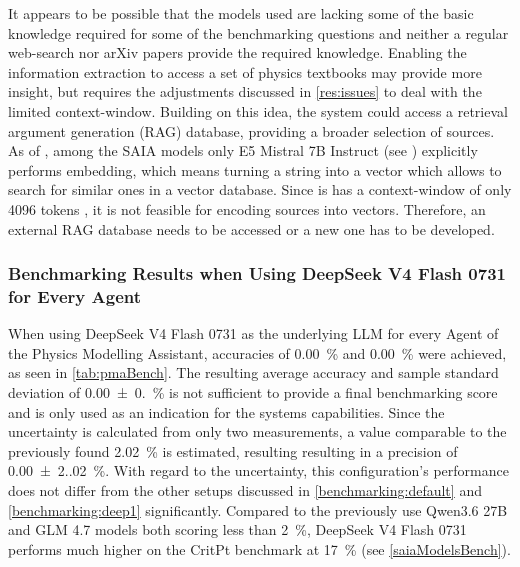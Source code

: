 \documentclass[
	fontsize = 11pt,
	paper = a4,
	draft = false,
	twoside = true,
	titlepage = false
]{scrartcl}
\numberwithin{equation}{subsection}
\begin{document}
	It appears to be possible that the models used are lacking some of the basic knowledge required for some of the benchmarking questions and neither a regular web-search nor arXiv papers provide the required knowledge. Enabling the information extraction to access a set of physics textbooks may provide more insight, but requires the adjustments discussed in \autoref{res:issues} to deal with the limited \gls{context-window}. Building on this idea, the system could access a retrieval argument generation (RAG) database, providing a broader selection of sources. As of , among the SAIA models only E5 Mistral 7B Instruct (see \autocite{saiaModDetail}) explicitly performs embedding, which means turning a string into a vector which allows to search for similar ones in a vector database. Since is has a \gls{context-window} of only 4096 \glspl{token} \autocite{saiaModDetail}, it is not feasible for encoding sources into vectors. Therefore, an external RAG database needs to be accessed or a new one has to be developed.
	
	\subsubsection{Benchmarking Results when Using DeepSeek V4 Flash 0731 for Every \gls{Agent}} \label{benchmark:allDeep}
	When using DeepSeek V4 Flash 0731 as the underlying \gls{LLM} for every \gls{Agent} of the Physics Modelling Assistant, accuracies of \SI[round-mode=places, round-precision=2]{0.00}{\percent} and \SI[round-mode=places, round-precision=2]{0.00}{\percent} were achieved, as seen in \autoref{tab:pmaBench}. The resulting average accuracy and sample standard deviation of \SI[round-mode=places, round-precision=2]{0.00(0.00)}{\percent} is not sufficient to provide a final benchmarking score and is only used as an indication for the systems capabilities. Since the uncertainty is calculated from only two measurements, a value comparable to the previously found \SI{2.02}{\percent} is estimated, resulting resulting in a precision of \SI[round-mode=places, round-precision=2]{0.00(2.02)}{\percent}. With regard to the uncertainty, this configuration's performance does not differ from the other setups discussed in \autoref{benchmarking:default} and \autoref{benchmarking:deep1} significantly. Compared to the previously use Qwen3.6 27B and GLM 4.7 models both scoring less than \SI{2}{\percent}, DeepSeek V4 Flash 0731 performs much higher on the CritPt benchmark at \SI{17}{\percent} (see \autoref{saiaModelsBench}).
	
\end{document}
